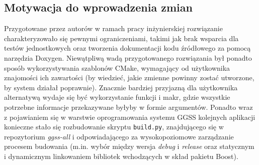 \subsection{Motywacja do wprowadzenia zmian}
Przygotowane przez autorów w ramach pracy inżynierskiej rozwiązanie charakteryzowało się pewnymi ograniczeniami, takimi jak brak wsparcia dla testów jednostkowych oraz tworzenia dokumentacji kodu źródłowego za pomocą narzędzia Doxygen. Niewątpliwą wadą przygotowanego rozwiązania był ponadto sposób wykorzystywania szablonów CMake, wymagający od użytkownika znajomości ich zawartości (by wiedzieć, jakie zmienne powinny zostać utworzone, by system działał poprawnie). Znacznie bardziej przyjazną dla użytkownika alternatywą wydaje się być wykorzystanie funkcji i makr, gdzie wszystkie potrzebne informacje przekazywane byłyby w formie argumentów. Ponadto wraz z pojawianiem się w warstwie oprogramowania systemu GGSS kolejnych aplikacji konieczne stało się rozbudowanie skryptu \lstinline{build.py}, znajdującego się w repozytorium \emph{ggss-all} i odpowiadającego za wysokopoziomowe zarządzanie procesem budowania (m.in. wybór między wersja \emph{debug} i \emph{release} oraz statycznym i dynamicznym linkowaniem bibliotek wchodzących w skład pakietu Boost).

